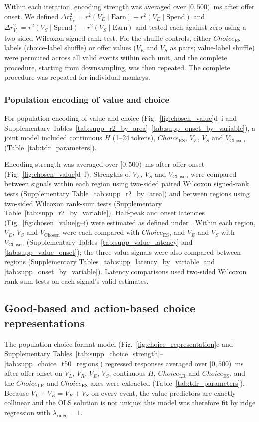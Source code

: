 \documentclass[pdflatex,sn-mathphys-num]{sn-jnl}%
\begin{document}
Within each iteration, encoding strength was averaged over $[0,500)$~ms after offer onset. We defined $\Delta r^2_{V_E}=r^2(V_E\mid\mathrm{Earn})-r^2(V_E\mid\mathrm{Spend})$ and $\Delta r^2_{V_S}=r^2(V_S\mid\mathrm{Spend})-r^2(V_S\mid\mathrm{Earn})$ and tested each against zero using a two-sided Wilcoxon signed-rank test. For the shuffle controls, either $\mathit{Choice}_{\mathrm{ES}}$ labels (choice-label shuffle) or offer values ($V_E$ and $V_S$ as pairs; value-label shuffle) were permuted across all valid events within each unit, and the complete procedure, starting from downsampling, was then repeated. The complete procedure was repeated for individual monkeys.

\subsubsection{Population encoding of value and choice}\label{sec:m_population}
For population encoding of value and choice (Fig.~\ref{fig:chosen_value}d--i and Supplementary Tables~\ref{tab:supp_r2_by_area}--\ref{tab:supp_onset_by_variable}), a joint model included continuous $H$ (1--24 tokens), $\mathit{Choice}_{\mathrm{ES}}$, $V_E$, $V_S$ and $V_{\mathrm{Chosen}}$ (Table~\ref{tab:tdr_parameters}).

Encoding strength was averaged over $[0,500)$~ms after offer onset (Fig.~\ref{fig:chosen_value}d--f). Strengths of $V_E$, $V_S$ and $V_{\mathrm{Chosen}}$ were compared between signals within each region using two-sided paired Wilcoxon signed-rank tests (Supplementary Table~\ref{tab:supp_r2_by_area}) and between regions using two-sided Wilcoxon rank-sum tests (Supplementary Table~\ref{tab:supp_r2_by_variable}). Half-peak and onset latencies (Fig.~\ref{fig:chosen_value}g--i) were estimated as defined under . Within each region, $V_E$, $V_S$ and $V_{\mathrm{Chosen}}$ were each compared with $\mathit{Choice}_{\mathrm{ES}}$, and $V_E$ and $V_S$ with $V_{\mathrm{Chosen}}$ (Supplementary Tables~\ref{tab:supp_value_latency} and \ref{tab:supp_value_onset}); the three value signals were also compared between regions (Supplementary Tables~\ref{tab:supp_latency_by_variable} and \ref{tab:supp_onset_by_variable}). Latency comparisons used two-sided Wilcoxon rank-sum tests on each signal's valid estimates.

\subsection{Good-based and action-based choice representations}\label{sec:m_goodaction}
The population choice-format model (Fig.~\ref{fig:choice_representation}c and Supplementary Tables~\ref{tab:supp_choice_strength}--\ref{tab:supp_choice_t50_regions}) regressed responses averaged over $[0,500)$~ms after offer onset on $V_L$, $V_R$, $V_E$, $V_S$, continuous $H$, $\mathit{Choice}_{\mathrm{LR}}$ and $\mathit{Choice}_{\mathrm{ES}}$, and the $\mathit{Choice}_{\mathrm{LR}}$ and $\mathit{Choice}_{\mathrm{ES}}$ axes were extracted (Table~\ref{tab:tdr_parameters}). Because $V_L+V_R=V_E+V_S$ on every event, the value predictors are exactly collinear and the OLS solution is not unique; this model was therefore fit by ridge regression with $\lambda_{\mathrm{ridge}}=1$.
\end{document}
